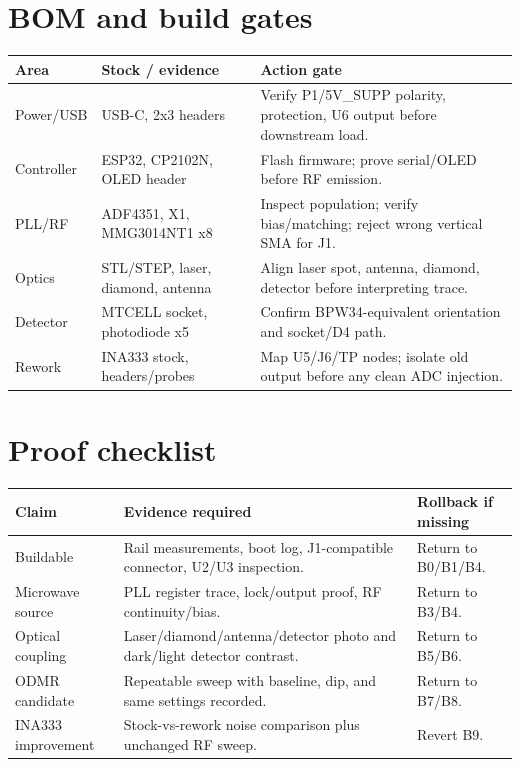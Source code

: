 \documentclass[10pt]{article}
\begin{document}
\section{BOM and build gates}

\begin{center}\scriptsize
\begin{tabular}{|L{1.15in}|L{1.45in}|L{3.25in}|}
\hline
\textbf{Area} & \textbf{Stock / evidence} & \textbf{Action gate} \\
\hline
Power/USB & USB-C, 2x3 headers & Verify P1/5V\_SUPP polarity, protection, U6 output before downstream load. \\
\hline
Controller & ESP32, CP2102N, OLED header & Flash firmware; prove serial/OLED before RF emission. \\
\hline
PLL/RF & ADF4351, X1, MMG3014NT1 x8 & Inspect population; verify bias/matching; reject wrong vertical SMA for J1. \\
\hline
Optics & STL/STEP, laser, diamond, antenna & Align laser spot, antenna, diamond, detector before interpreting trace. \\
\hline
Detector & MTCELL socket, photodiode x5 & Confirm BPW34-equivalent orientation and socket/D4 path. \\
\hline
Rework & INA333 stock, headers/probes & Map U5/J6/TP nodes; isolate old output before any clean ADC injection. \\
\hline
\end{tabular}
\end{center}

\section{Proof checklist}

\begin{center}\scriptsize
\begin{tabular}{|L{1.25in}|L{2.2in}|L{2.25in}|}
\hline
\textbf{Claim} & \textbf{Evidence required} & \textbf{Rollback if missing} \\
\hline
Buildable & Rail measurements, boot log, J1-compatible connector, U2/U3 inspection. & Return to B0/B1/B4. \\
\hline
Microwave source & PLL register trace, lock/output proof, RF continuity/bias. & Return to B3/B4. \\
\hline
Optical coupling & Laser/diamond/antenna/detector photo and dark/light detector contrast. & Return to B5/B6. \\
\hline
ODMR candidate & Repeatable sweep with baseline, dip, and same settings recorded. & Return to B7/B8. \\
\hline
INA333 improvement & Stock-vs-rework noise comparison plus unchanged RF sweep. & Revert B9. \\
\hline
\end{tabular}
\end{center}
\end{document}
